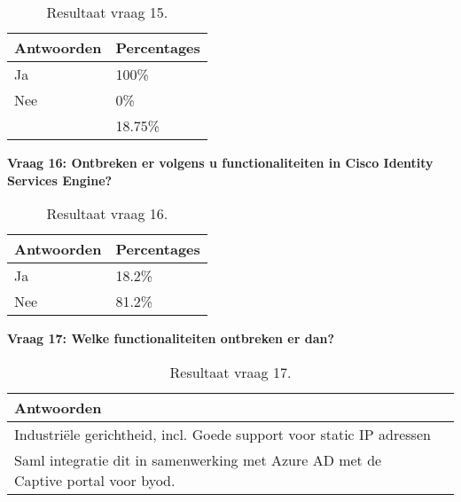 \begin{table}[h!]
	\begin{center}
		\begin{tabular}{|l|l|}
			\hline
\bf Antwoorden    & \bf Percentages \\ \hline
Ja      & 100\% \\ \hline
Nee     & 0\%    \\ \hline                                                                               & 18.75\% \\ \hline                                                        
		\end{tabular}
		\caption{Resultaat vraag 15.}
	\end{center}
\end{table}

\textbf{Vraag 16: Ontbreken er volgens u functionaliteiten in Cisco Identity Services Engine?}

\begin{table}[h!]
	\begin{center}
		\begin{tabular}{|l|l|}
		\hline
		\bf Antwoorden    & \bf Percentages \\ \hline
		Ja      & 18.2\% \\ \hline
		Nee     & 81.2\%    \\ \hline                                                         
		\end{tabular}
		\caption{Resultaat vraag 16.}
	\end{center}
\end{table}

\textbf{Vraag 17: Welke functionaliteiten ontbreken er dan?}

\begin{table}[H]
	\begin{center}
		\begin{tabular}{|l|l|}
			\hline
		\bf Antwoorden                                                                        \\ \hline
		Industriële gerichtheid, incl. Goede support voor static IP adressen              \\ \hline
		Saml integratie dit in samenwerking met Azure AD met de Captive portal voor byod. \\ \hline                                                      
		\end{tabular}
		\caption{Resultaat vraag 17.}
	\end{center}
\end{table}

